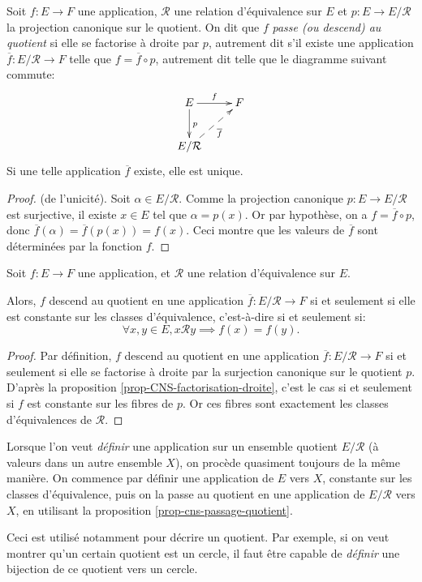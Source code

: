 \begin{propdef}
Soit $f : E\to F$ une application, $\mathcal R$ une relation d'équivalence sur $E$  et $p : E\to E/\mathcal R$ la projection canonique sur le quotient.
On dit que $f$ \emph{passe (ou descend) au quotient} si elle se factorise à droite par $p$, autrement dit s'il existe une application $\overline f : E/\mathcal R\to F$ telle que $f = \overline{f} \circ p$, autrement dit telle que le diagramme suivant commute:
\[
\xymatrix{
E \ar[r]^f \ar[d]^p & F\\
E/\mathcal R \ar@{-->}[ur]_{\overline f}& 
}
\] 
Si une telle application $\overline{f}$ existe, elle est unique.
\end{propdef}
\begin{proof}(de l'unicité). Soit $\alpha \in E/\mathcal R$. Comme la projection canonique $p : E\to E/\mathcal R$ est surjective, il existe $x\in E$ tel que $\alpha=p(x)$. Or par hypothèse, on a $f = \overline{f} \circ p$, donc $\overline f(\alpha) =\overline f(p(x))= f(x)$. Ceci montre que les valeurs de $\overline f$ sont déterminées par la fonction $f$.
\end{proof}


\begin{proposition}\label{prop-cns-passage-quotient}
Soit $f : E\to F$ une application, et $\mathcal R$ une relation d'équivalence sur $E$.

Alors, $f$ descend au quotient en une application $\overline f : E/\mathcal R \to F$ si et seulement si elle est constante sur les classes d'équivalence, c'est-à-dire si et seulement si:
\[
\forall x,y\in E, x\mathcal R y \implies f(x)=f(y).
\]
\end{proposition}

\begin{proof}
Par définition, $f$ descend au quotient en une application $\overline f : E/\mathcal R \to F$ si et seulement si elle se factorise à droite par la surjection canonique sur le quotient $p$.
D'après la proposition \ref{prop-CNS-factorisation-droite}, c'est le cas si et seulement si $f$ est constante sur les fibres de $p$.
Or ces fibres sont exactement les classes d'équivalences de $\mathcal R$.
\end{proof}

\begin{mdframed}[linewidth=2]
Lorsque l'on veut \emph{définir} une application sur un ensemble quotient $E/\mathcal R$ (à valeurs dans un autre ensemble $X$), on procède quasiment toujours de la même manière. On commence par définir une application de $E$ vers $X$, constante sur les classes d'équivalence, puis on la passe au quotient en une application de $E/\mathcal R$ vers $X$, en utilisant la proposition \ref{prop-cns-passage-quotient}.

Ceci est utilisé notamment pour décrire un quotient. Par exemple, si on veut montrer qu'un certain quotient \og est\fg{} un cercle, il faut être capable de \emph{définir} une bijection de ce quotient vers un cercle.
\end{mdframed}

